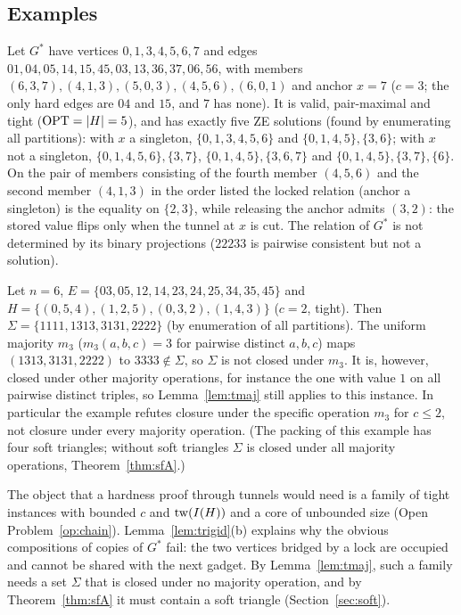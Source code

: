 \subsection{Examples}
\begin{example}\label{ex:gstar}
Let $G^*$ have vertices $0,1,3,4,5,6,7$ and edges $01,\allowbreak 04,\allowbreak 05,\allowbreak 14,\allowbreak 15,\allowbreak 45,\allowbreak 03,\allowbreak 13,\allowbreak 36,\allowbreak 37,\allowbreak 06,\allowbreak 56$, with members $(6,3,7),(4,1,3),(5,0,3),(4,5,6),(6,0,1)$ and anchor $x=7$ ($c=3$; the only hard edges are $04$ and $15$, and $7$ has none). It is valid, pair-maximal and tight ($\mathrm{OPT}=|H|=5$), and has exactly five ZE solutions (found by enumerating all partitions): with $x$ a singleton, $\{0,1,3,4,5,6\}$ and $\{0,1,4,5\},\{3,6\}$; with $x$ not a singleton, $\{0,1,4,5,6\},\{3,7\}$, $\{0,1,4,5\},\{3,6,7\}$ and $\{0,1,4,5\},\{3,7\},\{6\}$. On the pair of members consisting of the fourth member $(4,5,6)$ and the second member $(4,1,3)$ in the order listed the locked relation (anchor a singleton) is the equality on $\{2,3\}$, while releasing the anchor admits $(3,2)$: the stored value flips only when the tunnel at $x$ is cut. The relation of $G^*$ is not determined by its binary projections ($22233$ is pairwise consistent but not a solution).
\end{example}
\begin{example}\label{ex:maj}
Let $n=6$, $E=\{03,\allowbreak 05,\allowbreak 12,\allowbreak 14,\allowbreak 23,\allowbreak 24,\allowbreak 25,\allowbreak 34,\allowbreak 35,\allowbreak 45\}$ and $H=\{(0,5,4),(1,2,5),(0,3,2),(1,4,3)\}$ ($c=2$, tight). Then $\Sigma=\{1111,1313,3131,2222\}$ (by enumeration of all partitions). The uniform majority $m_3$ ($m_3(a,b,c)=3$ for pairwise distinct $a,b,c$) maps $(1313,3131,2222)$ to $3333\notin\Sigma$, so $\Sigma$ is not closed under $m_3$. It is, however, closed under other majority operations, for instance the one with value $1$ on all pairwise distinct triples, so Lemma~\ref{lem:tmaj} still applies to this instance. In particular the example refutes closure under the specific operation $m_3$ for $c\le2$, not closure under every majority operation. (The packing of this example has four soft triangles; without soft triangles $\Sigma$ is closed under all majority operations, Theorem~\ref{thm:sfA}.)
\end{example}
The object that a hardness proof through tunnels would need is a family of tight instances with bounded $c$ and $\mathrm{tw}(I(H))$ and a core of unbounded size (Open Problem~\ref{op:chain}). Lemma~\ref{lem:trigid}(b) explains why the obvious compositions of copies of $G^*$ fail: the two vertices bridged by a lock are occupied and cannot be shared with the next gadget. By Lemma~\ref{lem:tmaj}, such a family needs a set $\Sigma$ that is closed under no majority operation, and by Theorem~\ref{thm:sfA} it must contain a soft triangle (Section~\ref{sec:soft}).
